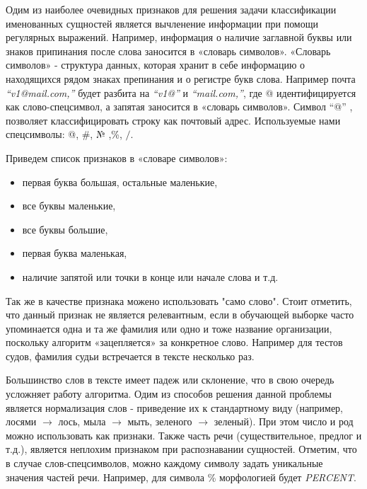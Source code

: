 \documentclass{csmathnotes}
\begin{document}
Одим из наиболее очевидных признаков для решения задачи классификации именованных сущностей является вычленение информации при помощи регулярных выражений. Например, информация о наличие заглавной буквы или знаков припинания после слова заносится в  «словарь символов». «Словарь символов» - структура данных, которая хранит в себе информацию о находящихся рядом знаках препинания и о регистре букв слова.
Например почта \emph{“v1@mail.com,”} будет разбита на \emph{“v1@”} и \emph{“mail.com,”}, где @ идентифицируется как слово-спецсимвол, а запятая заносится в «словарь символов». Символ “@” , позволяет классифицировать строку как почтовый адрес. Используемые нами спецсимволы: @, \#, № ,\%, $/$.


Приведем список признаков в «словаре символов»:
\begin{itemize}
    \item первая буква большая, остальные маленькие,
    \item все буквы маленькие,
    \item все буквы большие,
    \item первая буква маленькая,
    \item наличие запятой или точки в конце или начале слова и т.д.
\end{itemize}


Так же в качестве признака можено использовать "само слово". Стоит отметить, что данный признак не является релевантным, если в обучающей выборке часто упоминается одна и та же фамилия или одно и тоже название организации, поскольку алгоритм «зацепляется» за конкретное слово.
Например для тестов судов, фамилия судьи встречается в тексте несколько раз.


Большинство слов в тексте имеет падеж или склонение, что в свою очередь усложняет работу алгоритма.
Одим из способов решения данной проблемы является нормализация слов - приведение их к стандартному виду
(например, лосями $\rightarrow$  лось, мыла $\rightarrow$ мыть, зеленого $\rightarrow$ зеленый).
При этом число и род можно использовать как признаки.
Также часть речи (существительное, предлог и т.д.), является неплохим признаком при распознавании сущностей.
Отметим, что в случае слов-спецсимволов, можно каждому символу задать уникальные значения частей речи.
Например, для символа \% морфологией будет \emph{PERCENT}.
\end{document}
